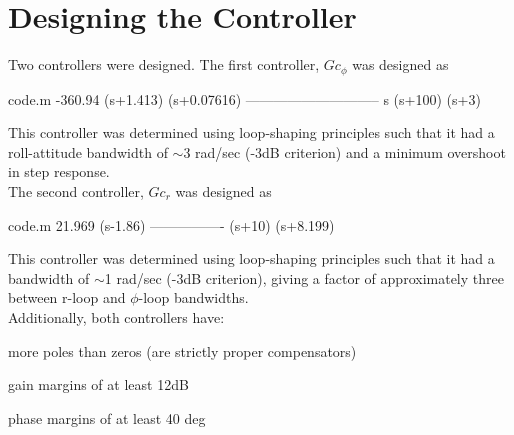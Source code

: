 \documentclass[12pt]{article}
\begin{document}
\clearpage
\section{Designing the Controller}

% 

Two controllers were designed. The first controller, $Gc_{\phi}$ was designed as
\begin{filecontents*}{code.m}
  -360.94 (s+1.413) (s+0.07616)
  -----------------------------
         s (s+100) (s+3)
\end{filecontents*}


\noindent This controller was determined using loop-shaping principles such that it had a roll-attitude bandwidth of $\sim$3 rad/sec (-3dB criterion) and a minimum overshoot in step response. \\

\noindent The second controller, $Gc_r$ was designed as
\begin{filecontents*}{code.m}
  21.969 (s-1.86)
  ----------------
  (s+10) (s+8.199)
\end{filecontents*}


\noindent This controller was determined using loop-shaping principles such that it had a bandwidth of $\sim$1 rad/sec (-3dB criterion), giving a factor of approximately three between r-loop and $\phi$-loop bandwidths. \\

\noindent Additionally, both controllers have:

more poles than zeros (are strictly proper compensators)

gain margins of at least 12dB

phase margins of at least 40 deg

 

\end{document}
